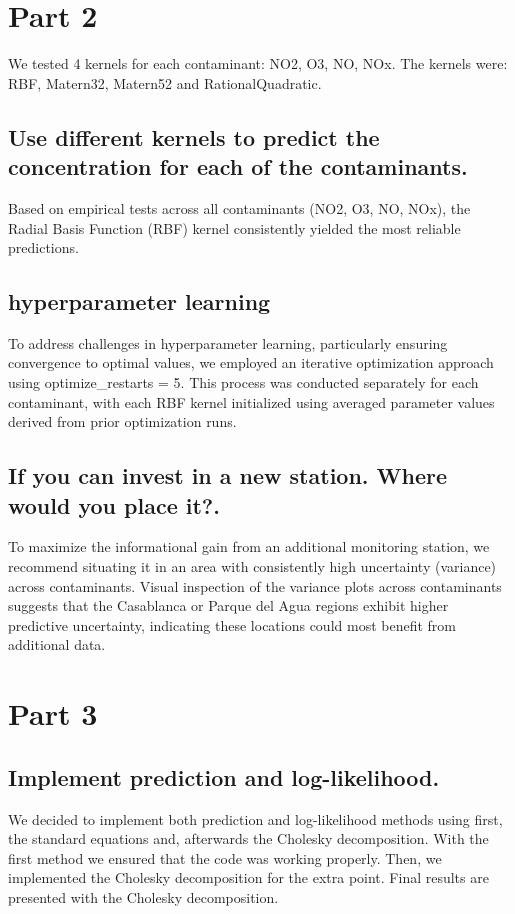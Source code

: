 \documentclass[twocolumn]{article}
\begin{document}
\section{Part 2}
We tested 4 kernels for each contaminant: NO2, O3, NO, NOx. 
The kernels were: RBF, Matern32, Matern52 and RationalQuadratic.

\subsection{Use different kernels to predict the concentration for each of the contaminants.}
Based on empirical tests across all contaminants (NO2, O3, NO, NOx), 
the Radial Basis Function (RBF) kernel consistently yielded the most reliable predictions. 


\subsection{hyperparameter learning}
To address challenges in hyperparameter learning, particularly ensuring convergence 
to optimal values, we employed an iterative optimization approach using 
optimize\_restarts = 5. This process was conducted 
separately for each contaminant, with each RBF kernel initialized 
using averaged parameter values derived from prior optimization runs. 

\subsection{If you can invest in a new station. Where would you place it?.} 
To maximize the informational gain from an additional monitoring station,
 we recommend situating it in an area with consistently high uncertainty (variance) 
 across contaminants. Visual inspection of the variance plots across contaminants 
 suggests that the Casablanca or Parque del Agua regions exhibit higher predictive 
 uncertainty, indicating these locations could most benefit from additional data.

 \section{Part 3}


\subsection{Implement prediction and log-likelihood.}
We decided to implement both prediction and log-likelihood methods using first, 
the standard equations and, afterwards the Cholesky decomposition. With the first
method we ensured that the code was working properly. Then, we implemented the Cholesky
decomposition for the extra point. Final results are presented with the Cholesky decomposition.
\end{document}
